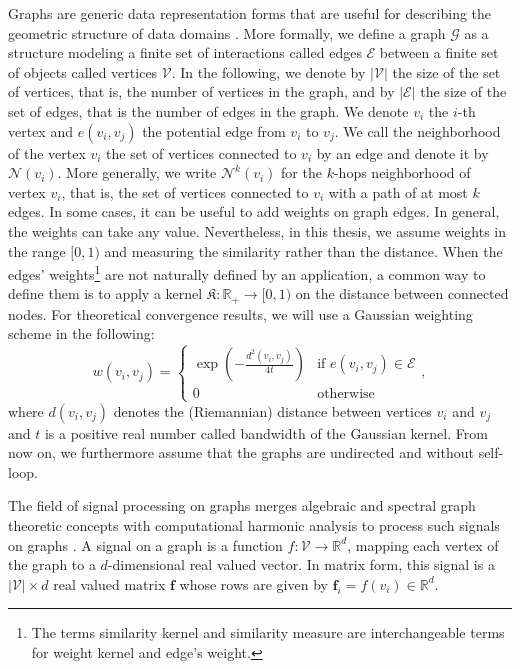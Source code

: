 \documentclass{article}
\begin{document}
Graphs are generic data representation forms that are useful for describing the geometric structure of data domains \citep{west1996introduction}. More formally, we define a graph $\mathcal{G}$ as a structure modeling a finite set of interactions called edges $\mathcal{E}$ between a finite set of objects called vertices $\mathcal{V}$. In the following, we denote by $|\mathcal{V}|$ the size of the set of vertices, that is, the number of vertices in the graph, and by $|\mathcal{E}|$ the size of the set of edges, that is the number of edges in the graph. We denote $v_i$ the $i$-th vertex and $e(v_i, v_j)$ the potential edge from $v_i$ to $v_j$. We call the neighborhood of the vertex $v_i$ the set of vertices connected to $v_i$ by an edge and denote it by $\mathcal{N}(v_i)$. More generally, we write $\mathcal{N}^k(v_i)$ for the $k$-hops neighborhood of vertex $v_i$, that is, the set of vertices connected to $v_i$ with a path of at most $k$ edges. In some cases, it can be useful to add weights on graph edges. In general, the weights can take any value. Nevertheless, in this thesis, we assume weights in the range $[0, 1)$ and measuring the similarity rather than the distance. When the edges' weights\footnote{The terms similarity kernel and similarity measure are interchangeable terms for weight kernel and edge's weight.} are not naturally defined by an application, a common way to define them is to apply a kernel $\mathfrak{K} : \mathbb{R}_+ \to [0, 1)$ on the distance between connected nodes. For theoretical convergence results, we will use a Gaussian weighting scheme in the following: 
\begin{equation}
w(v_i, v_j) =
\left\{ 
\begin{array}{ll}
\exp \left(- \frac{d^2(v_i, v_j)}{4t}\right) & \text{if } e(v_i, v_j) \in \mathcal{E} \\
0 & \text{otherwise}
\end{array}
\right.,
\end{equation}
where $d(v_i, v_j)$ denotes the (Riemannian) distance between vertices $v_i$ and $v_j$ and $t$ is a positive real number called bandwidth of the Gaussian kernel. From now on, we furthermore assume that the graphs are undirected and without self-loop.

The field of signal processing on graphs merges algebraic and spectral graph theoretic concepts with computational harmonic analysis to process such signals on graphs \citep{shuman2013gsp}. A signal on a graph is a function $f : \mathcal{V} \to \mathbb{R}^d$, mapping each vertex of the graph to a $d$-dimensional real valued vector. In matrix form, this signal is a $|\mathcal{V}| \times d$ real valued matrix $\boldsymbol{f}$ whose rows are given by $\boldsymbol{f}_i = f(v_i) \in \mathbb{R}^d$. 
\end{document}
